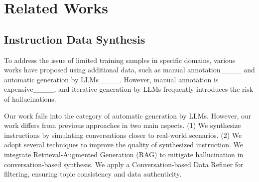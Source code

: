 \section{Related Works}


\subsection{Instruction Data Synthesis}
To address the issue of limited training samples in specific domains, various works have proposed using additional data, such as manual annotation____ and automatic generation by LLMs____. However, manual annotation is expensive____, and iterative generation by LLMs frequently introduces the risk of hallucinations.


Our work falls into the category of automatic generation by LLMs. However, our work differs from previous approaches in two main aspects. (1) We synthesize instructions by simulating conversations closer to real-world scenarios. (2) We adopt several techniques to improve the quality of synthesized instruction. We integrate Retrieval-Augmented Generation (RAG) to mitigate hallucination in conversation-based synthesis. We apply a Conversation-based Data Refiner for filtering, ensuring topic consistency and data authenticity.
